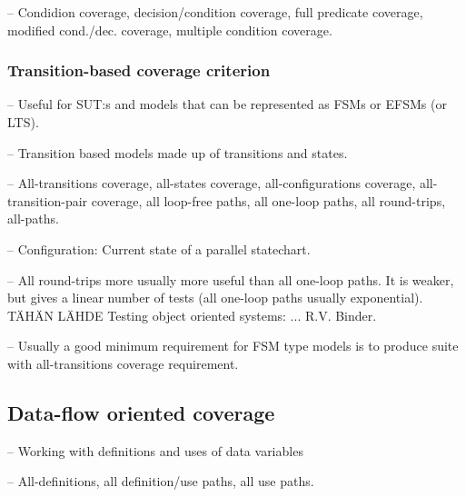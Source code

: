 -- Condidion coverage, decision/condition coverage, full predicate coverage, modified cond./dec. coverage, multiple condition coverage.

\subsubsection{Transition-based coverage criterion}
-- Useful for SUT:s and models that can be represented as FSMs or EFSMs (or LTS).

-- Transition based models made up of transitions and states.

-- All-transitions coverage, all-states coverage, all-configurations coverage, all-transition-pair coverage, all loop-free paths, all one-loop paths, all round-trips, all-paths.

-- Configuration: Current state of a parallel statechart.

-- All round-trips more usually more useful than all one-loop paths. It is weaker, but gives a linear number of tests (all one-loop paths usually exponential). TÄHÄN LÄHDE Testing object oriented systems: ... R.V. Binder.

-- Usually a good minimum requirement for FSM type models is to produce suite with all-transitions coverage requirement.

\subsection{Data-flow oriented coverage}
-- Working with definitions and uses of data variables

-- All-definitions, all definition/use paths, all use paths.